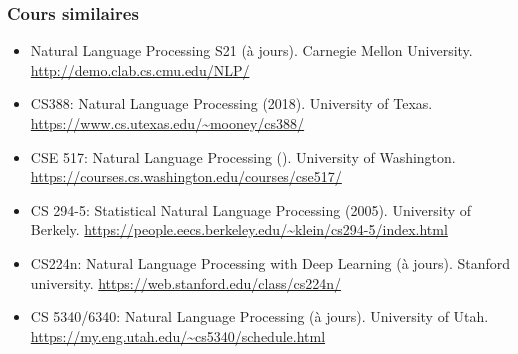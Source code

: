 \documentclass{beamer}
\begin{document}
\begin{frame}
	\frametitle{Cours similaires}
	
	\begin{itemize}
		
		\item Natural Language Processing S21 (à jours).
		Carnegie Mellon University. 
		\url{http://demo.clab.cs.cmu.edu/NLP/}
		
		\item CS388: Natural Language Processing (2018). 
		University of Texas. 
		\url{https://www.cs.utexas.edu/~mooney/cs388/}
		
		\item CSE 517: Natural Language Processing ().
		University of Washington.
		\url{https://courses.cs.washington.edu/courses/cse517/}
		
		\item CS 294-5: Statistical Natural Language Processing (2005). 
		University of Berkely. 
		\url{https://people.eecs.berkeley.edu/~klein/cs294-5/index.html}
		
		\item CS224n: Natural Language Processing with Deep Learning (à jours).
		Stanford university.
		\url{https://web.stanford.edu/class/cs224n/}
		
		\item CS 5340/6340: Natural Language Processing (à jours). 
		University of Utah.
		\url{https://my.eng.utah.edu/~cs5340/schedule.html}
		
	\end{itemize}
	
\end{frame}
\end{document}
